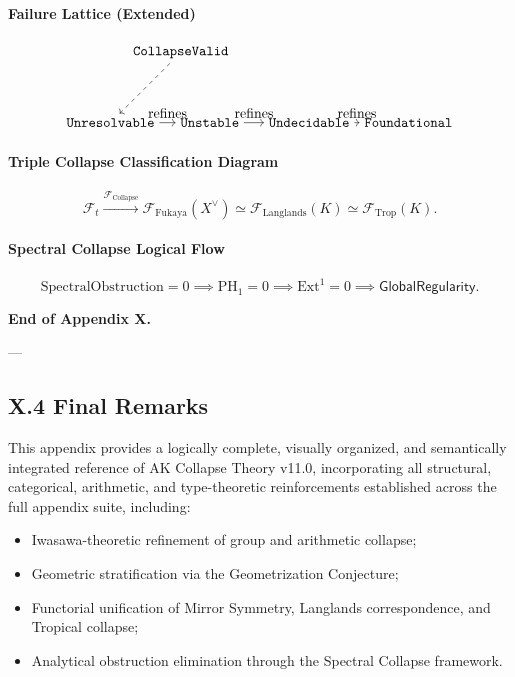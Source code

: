 \documentclass[11pt]{article}
\begin{document}
\paragraph{Failure Lattice (Extended)}
\[
\begin{tikzpicture}[node distance=2.5cm, auto]
  \node (Valid) {\texttt{CollapseValid}};
  \node (Unres) [below left of=Valid] {\texttt{Unresolvable}};
  \node (Unst) [right of=Unres] {\texttt{Unstable}};
  \node (Undec) [right of=Unst] {\texttt{Undecidable}};
  \node (Found) [right of=Undec] {\texttt{Foundational}};
  \draw[dashed,->] (Valid) to (Unres);
  \draw[->] (Unres) to node {refines} (Unst);
  \draw[->] (Unst) to node {refines} (Undec);
  \draw[->] (Undec) to node {refines} (Found);
\end{tikzpicture}
\]

\paragraph{Triple Collapse Classification Diagram}
\[
\mathcal{F}_t \xrightarrow{\mathcal{F}_{\mathrm{Collapse}}}
\mathcal{F}_{\mathrm{Fukaya}}(X^\vee) \simeq
\mathcal{F}_{\mathrm{Langlands}}(K) \simeq
\mathcal{F}_{\mathrm{Trop}}(K).
\]

\paragraph{Spectral Collapse Logical Flow}
\[
\mathrm{SpectralObstruction} = 0 \implies \mathrm{PH}_1 = 0 \implies \mathrm{Ext}^1 = 0 \implies \mathsf{GlobalRegularity}.
\]

\vspace{1em}
\textbf{End of Appendix X.}

---

\subsection*{X.4 Final Remarks}

This appendix provides a logically complete, visually organized, and semantically integrated reference of AK Collapse Theory v11.0, incorporating all structural, categorical, arithmetic, and type-theoretic reinforcements established across the full appendix suite, including:

\begin{itemize}
    \item Iwasawa-theoretic refinement of group and arithmetic collapse;
    \item Geometric stratification via the Geometrization Conjecture;
    \item Functorial unification of Mirror Symmetry, Langlands correspondence, and Tropical collapse;
    \item Analytical obstruction elimination through the Spectral Collapse framework.
\end{itemize}
\end{document}
